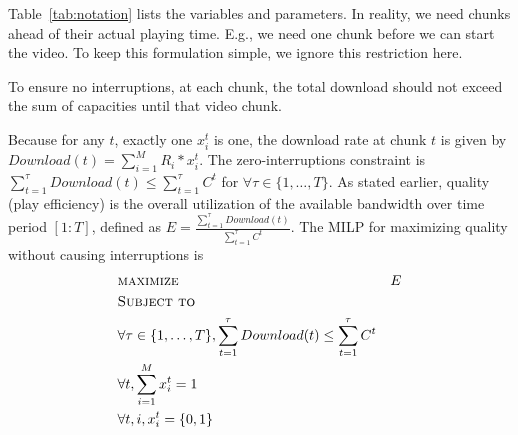 
Table~\ref{tab:notation} lists the variables and parameters.
In reality, we need chunks ahead of their actual playing
time. E.g., we need one chunk before we can start the video. To keep
this formulation simple, we ignore this restriction here.

To ensure  no interruptions, at each chunk, the total download
should not exceed the sum of capacities until that video chunk.



Because for any $t$, exactly one $x_i^t$ is one, the download
rate at chunk $t$ is given by 
$Download(t) = \sum \limits_{i=1}^M R_i *  x_i^t$. 
The zero-interruptions constraint is 
$\sum \limits_{t=1}^\tau  Download(t) \leq\sum\limits_{t=1}^\tau C^t$
for $\forall \tau \in \{1, \dots, T\}$.
As stated earlier, quality (play efficiency) 
is the overall utilization of the available bandwidth
over time period $[1:T]$, defined as
${E}=\frac{\sum\limits_{t=1}^\tau  Download(t)}{\sum\limits_{t=1}^\tau C^t}$. 
The MILP for maximizing quality without causing interruptions is
\begin{subequations}
\begin{align*}
&\textsc{maximize }&{E}\\ 
&\textsc{Subject to}\\
&\forall \tau \in \{1, \dots, T\}, \sum \limits_{t=1}^\tau  Download(t)
\leq\sum\limits_{t=1}^\tau C^t \\
& \forall t, \sum \limits_{i=1}^M x_i^t =1\ \\
& \forall t, i, x_i^t = \{0,1\}
\end{align*}
\end{subequations}

